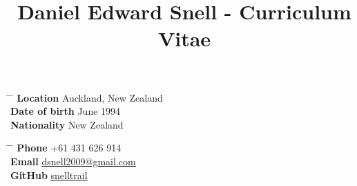 \documentclass[hidelinks, 10pt]{article} %
\begin{document}

\title{Daniel Edward Snell - Curriculum Vitae} %


\parbox{0.5\textwidth}{ %
    \begin{tabbing} %
        \hspace{3cm} \= \hspace{4cm} \= \kill %
        {\bf Location} \> Auckland, New Zealand\\
        {\bf Date of birth}  June 1994 \\ %
        {\bf Nationality} \> New Zealand %
    \end{tabbing}}
\hfill %
\parbox{0.5\textwidth}{ %
    \begin{tabbing} %
        \hspace{3cm} \= \hspace{4cm} \= \kill %
        {\bf Phone} \> +61 431 626 914 \\ %
        {\bf Email} \> \href{mailto:dsnell2009@gmail.com}{\underline{dsnell2009@gmail.com}} \\ %
        {\bf GitHub} \> \href{https://github.com/snelltrail}{\underline{snelltrail}} \\
    \end{tabbing}}


%
\end{document}
